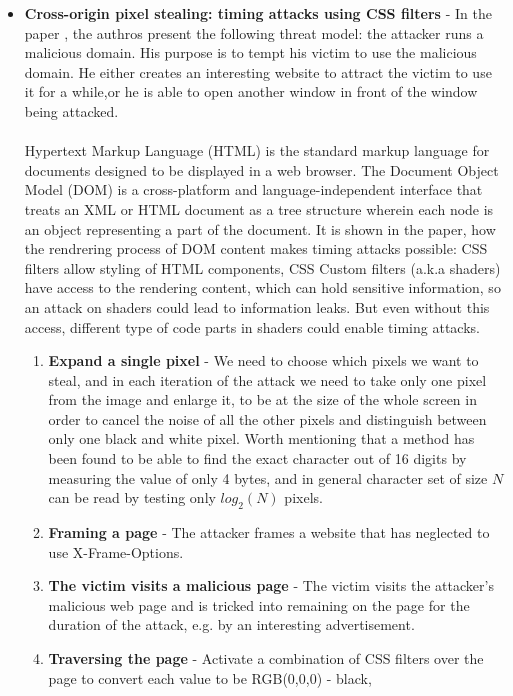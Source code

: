 \begin{itemize}
    \item \textbf{Cross-origin pixel stealing: timing attacks using CSS filters} - In the paper \cite{kotcher2013cross}, the authros present the
    following threat model: the attacker runs a malicious domain. His purpose is to tempt his victim to use the malicious domain. He either creates
    an interesting website to attract the victim to use it for a while,or he is able to open another window in front of the window being attacked.
    \\\\
    Hypertext Markup Language (HTML) is the standard markup language for documents designed to be displayed in a web browser. The Document Object Model
    (DOM) is a cross-platform and language-independent interface that treats an XML or HTML document as a tree structure wherein each node is an object
    representing a part of the document. It is shown in the paper, how the rendrering process of DOM content makes timing attacks possible: CSS filters
    allow styling of HTML components, CSS Custom filters (a.k.a shaders) have access to the rendering content, which can hold sensitive information, so
    an attack on shaders could lead to information leaks. But even without this access, different type of code parts in shaders could enable timing attacks.
    \begin{enumerate}
        \item \textbf{Expand a single pixel} - We need to choose which pixels we want to steal, and in each iteration of the attack we need to take only
        one pixel from the image and enlarge it, to be at the size of the whole screen in order to cancel the noise of all the other pixels and distinguish
        between only one black and white pixel. Worth mentioning that a method has been found to be able to find the exact character out of 16 digits by
        measuring the value of only 4 bytes, and in general character set of size $N$ can be read by testing only $log_2(N)$ pixels.
        \item \textbf{Framing a page} - The attacker frames a website that has neglected to use X-Frame-Options.
        \item \textbf{The victim visits a malicious page} - The victim visits the attacker’s malicious web page and is tricked into remaining on the page
        for the duration of the attack, e.g. by an interesting advertisement.
        \item \textbf{Traversing the page} - Activate a combination of CSS filters over the page to convert each value to be RGB(0,0,0) - black,

\end{enumerate}
\end{itemize}
